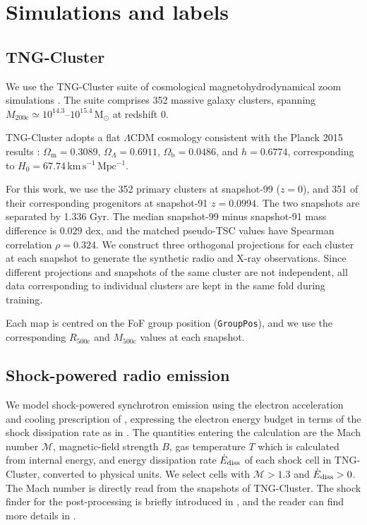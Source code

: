 \section{Simulations and labels}
\label{sec:sims}

\subsection{TNG-Cluster}

We use the TNG-Cluster suite of cosmological magnetohydrodynamical zoom simulations \citep{Nelson2024, Nelson2019}. The suite comprises 352 massive
galaxy clusters, spanning
$M_{200\mathrm{c}} \simeq 10^{14.3}$--$10^{15.4}\,\mathrm{M_\odot}$ at redshift 0.

TNG-Cluster adopts a flat $\Lambda$CDM cosmology consistent with the Planck 2015 results \citep{Planck2016}:
$\Omega_{\mathrm{m}}=0.3089$,
$\Omega_{\Lambda}=0.6911$,
$\Omega_{\mathrm{b}}=0.0486$, and
$h=0.6774$, corresponding to
$H_0=67.74\,\mathrm{km\,s^{-1}\,Mpc^{-1}}$.

For this work, we use the 352 primary clusters at snapshot-99 ($z=0$), and 351 of their corresponding progenitors at snapshot-91 $z = 0.0994$.
The two snapshots are separated by 1.336 Gyr.
The median snapshot-99 minus snapshot-91 mass difference is $0.029$ dex, and the matched pseudo-TSC values have Spearman correlation $\rho=0.324$.
We construct three orthogonal projections for each cluster at each snapshot to generate the synthetic radio and X-ray observations.
Since different projections and snapshots of the same cluster are not independent, all data corresponding to individual clusters are kept in the same fold during training.

Each map is centred on the FoF group position (\texttt{GroupPos}), and
we use the corresponding $R_{500\mathrm{c}}$ and
$M_{500\mathrm{c}}$ values at each snapshot.

\subsection{Shock-powered radio emission}
\label{sec:shock_radio}

We model shock-powered synchrotron emission using the electron
acceleration and cooling prescription of \citet{HoeftBruggen2007},
expressing the electron energy budget in terms of the shock
dissipation rate as in \citet{Lee2024}. The quantities entering the
calculation are the Mach number $\mathcal{M}$, magnetic-field
strength $B$, gas temperature $T$ which is calculated from internal energy, and energy dissipation rate $\dot{E}_{\rm diss}$ of each
shock cell in TNG-Cluster, converted to physical units. We select
cells with $\mathcal{M}>1.3$ and $\dot{E}_{\rm diss}>0$. The Mach number is directly read from the snapshots of TNG-Cluster. The shock finder for the post-processing is briefly introduced in \citet{Lee2024}, and the reader can find more details in \citet{Schaal2015}.


